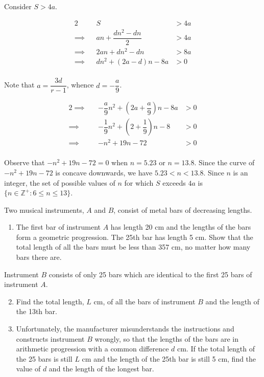 \documentclass{echw}
\begin{document}
            Consider $S > 4a$.

            \begin{alignat*}{2}
                &&S &> 4a\\
                \implies&&an + \dfrac{dn^2 - dn}2 &> 4a\\
                \implies&&2an + dn^2 - dn &> 8a\\
                \implies&& dn^2 + (2a-d)n - 8a &> 0\\
            \end{alignat*}

            Note that $a = \dfrac{3d}{r-1}$, whence $d = -\dfrac{a}9$.

            \begin{alignat*}{2}
                \implies&& -\dfrac{a}9n^2 + (2a+\dfrac{a}9)n - 8a &> 0\\
                \implies&& -\dfrac{1}9n^2 + (2+\dfrac{1}9)n - 8 &> 0\\
                \implies&& -n^2 + 19n - 72 &> 0\\             
            \end{alignat*}

            Observe that $-n^2 + 19n - 72 = 0$ when $n = 5.23$ or $n = 13.8$. Since the curve of $-n^2 + 19n - 72$ is concave downwards, we have $5.23 < n < 13.8$. Since $n$ is an integer, the set of possible values of $n$ for which $S$ exceeds $4a$ is $\{ n \in \mathbb{Z}^+ \colon 6 \leq n \leq 13\}$.


    \problem{}
        Two musical instruments, $A$ and $B$, consist of metal bars of decreasing lengths.

        \begin{enumerate}
            \item The first bar of instrument $A$ has length 20 cm and the lengths of the bars form a geometric progression. The 25th bar has length 5 cm. Show that the total length of all the bars must be less than 357 cm, no matter how many bars there are.
        \end{enumerate}

        \noindent Instrument $B$ consists of only 25 bars which are identical to the first 25 bars of instrument $A$.

        \begin{enumerate}
            \setcounter{enumi}{1}
            \item Find the total length, $L$ cm, of all the bars of instrument $B$ and the length of the 13th bar.
            \item Unfortunately, the manufacturer misunderstands the instructions and constructs instrument $B$ wrongly, so that the lengths of the bars are in arithmetic progression with a common difference $d$ cm. If the total length of the 25 bars is still $L$ cm and the length of the 25th bar is still 5 cm, find the value of $d$ and the length of the longest bar.
        \end{enumerate}
\end{document}
